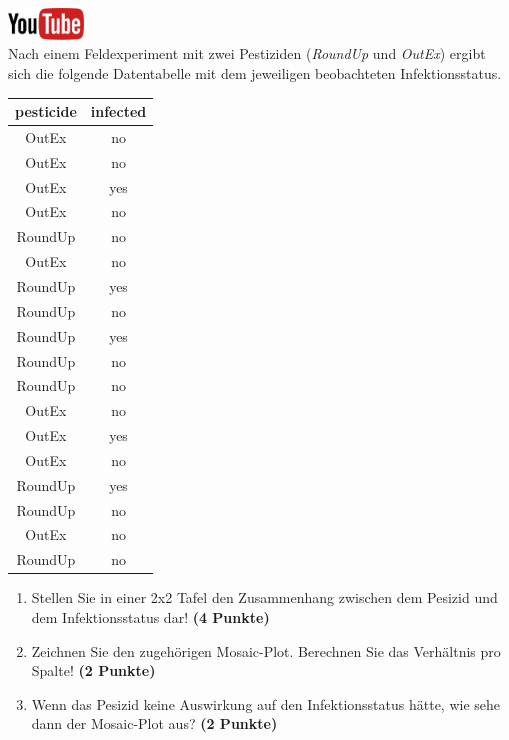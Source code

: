 \documentclass[a4paper, 10pt]{scrartcl}\usepackage[]{graphicx}\usepackage[]{xcolor}
\begin{document}
\hfill\href{https://youtu.be/t_1KL77mfmg}{\includegraphics[width =
  2cm]{img/youtube}}\\[1Ex]

Nach einem Feldexperiment mit zwei Pestiziden (\textit{RoundUp} und
\textit{OutEx}) ergibt sich die folgende Datentabelle mit dem jeweiligen
beobachteten Infektionsstatus.

\begin{table}[!h]
\centering
\begin{tabular}{cc}
\toprule
pesticide & infected\\
\midrule
OutEx & no\\
OutEx & no\\
OutEx & yes\\
OutEx & no\\
RoundUp & no\\
\addlinespace
OutEx & no\\
RoundUp & yes\\
RoundUp & no\\
RoundUp & yes\\
RoundUp & no\\
\addlinespace
RoundUp & no\\
OutEx & no\\
OutEx & yes\\
OutEx & no\\
RoundUp & yes\\
\addlinespace
RoundUp & no\\
OutEx & no\\
RoundUp & no\\
\bottomrule
\end{tabular}
\end{table}



\begin{enumerate}
\item Stellen Sie in einer 2x2 Tafel den Zusammenhang zwischen dem
  Pesizid und dem Infektionsstatus dar! \textbf{(4 Punkte)}
\item Zeichnen Sie den zugeh{\"o}rigen Mosaic-Plot. Berechnen Sie das
  Verh{\"a}ltnis pro Spalte! \textbf{(2 Punkte)}
\item Wenn das Pesizid keine Auswirkung auf den Infektionsstatus h{\"a}tte, wie
  sehe dann der Mosaic-Plot aus? \textbf{(2 Punkte)}
\end{enumerate} 
\clearpage
\end{document}
